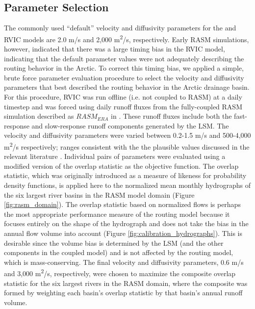 \subsection{Parameter Selection}
\label{sec:parameters}

The commonly used ``default'' velocity and diffusivity parameters for the \citet{Lohmann_1996} and RVIC models are 2.0 m/s and 2,000 m\textsuperscript{2}/s, respectively.
Early RASM simulations, however, indicated that there was a large timing bias in the RVIC model, indicating that the default parameter values were not adequately describing the routing behavior in the Arctic.
To correct this timing bias, we applied a simple, brute force parameter evaluation procedure to select the velocity and diffusivity parameters that best described the routing behavior in the Arctic drainage basin.
For this procedure, RVIC was run offline (i.e. not coupled to RASM) at a daily timestep and was forced using daily runoff fluxes from the fully-coupled RASM simulation described as $RASM_{ERA}$ in \citet{Hamman_2016a}.
These runoff fluxes include both the fast-response and slow-response runoff components generated by the LSM.
The velocity and diffusivity parameters were varied between 0.2-1.5 m/s and 500-4,000 m\textsuperscript{2}/s respectively; ranges consistent with the the plausible values discussed in the relevant literature \citep[e.g.][]{Decharme_2010,Lohmann_1996}.
Individual pairs of parameters were evaluated using a modified version of the overlap statistic \citep{Perkins_2007} as the objective function.
The overlap statistic, which was originally introduced as a measure of likeness for probability density functions, is applied here to the normalized mean monthly hydrographs of the six largest river basins in the RASM model domain (Figure \ref{fig:rasm_domain}).
The overlap statistic based on normalized flows is perhaps the most appropriate performance measure of the routing model because it focuses entirely on the shape of the hydrograph and does not take the bias in the annual flow volume into account (Figure \ref{fig:calibration_hydrographs}).
This is desirable since the volume bias is determined by the LSM (and the other components in the coupled model) and is not affected by the routing model, which is mass-conserving.
The final velocity and diffusivity parameters, 0.6 m/s and 3,000 m\textsuperscript{2}/s, respectively, were chosen to maximize the composite overlap statistic for the six largest rivers in the RASM domain, where the composite was formed by weighting each basin's overlap statistic by that basin's annual runoff volume.

